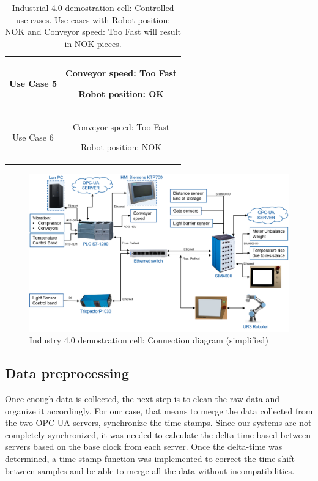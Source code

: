 \documentclass[5p,times,procedia]{elsarticle}
\begin{document}
\begin{table}
\begin{tabular}{ c c }
              Use Case 5  & \begin{minipage}[t]{0.25\textwidth}
                            \begin{description}
                                   \item Conveyor speed: Too Fast
                                   \item Robot position: OK
                            \end{description}
                            \end{minipage}  \\ \hline
              Use Case 6  & \begin{minipage}[t]{0.25\textwidth}
                            \begin{description}
                                   \item Conveyor speed: Too Fast
                                   \item Robot position: NOK
                            \end{description}
                            \end{minipage}  \\ \bottomrule
       \end{tabular}
       \caption{Industrial 4.0 demostration cell: Controlled use-cases.
       Use cases with Robot position: NOK and Conveyor speed: Too Fast will result in NOK pieces.}
       \label{tab:use_cases}
\end{table}


\begin{figure}
       \includegraphics[width=.45\textwidth]{img/demozelle_conex_diagram.png}
       \caption{Industry 4.0 demostration cell: Connection diagram (simplified)
             }
\label{fig:demo_conn_diag}
\end{figure}

\subsection{Data preprocessing}

Once enough data is collected, the next step is to clean the raw data and organize it accordingly. For our case, that means to merge the data collected from the two OPC-UA servers, synchronize the time stamps. Since our systems are not completely synchronized, it was needed to calculate the delta-time based between servers based on the base clock from each server. Once the delta-time was determined, a time-stamp function was implemented to correct the time-shift between samples and be able to merge all the data without incompatibilities.
\end{document}
